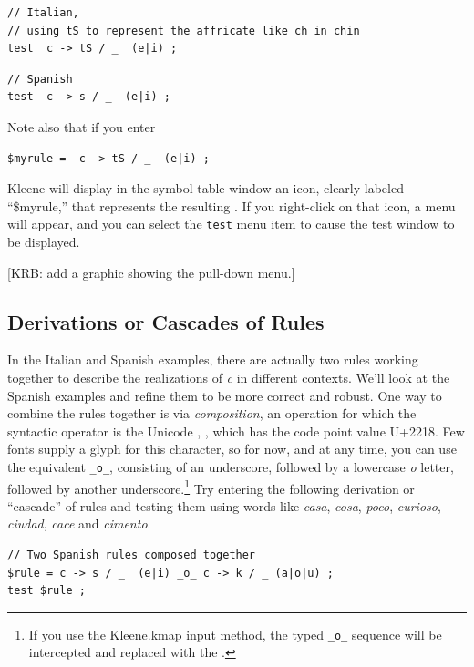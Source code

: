 \begin{Verbatim}
// Italian, 
// using tS to represent the affricate like ch in chin
test  c -> tS / _  (e|i) ;
\end{Verbatim}

\begin{Verbatim}
// Spanish
test  c -> s / _  (e|i) ;
\end{Verbatim}


\noindent
Note also that if you enter

\begin{Verbatim}
$myrule =  c -> tS / _  (e|i) ;
\end{Verbatim}

\noindent
Kleene will display in the symbol-table window an icon, clearly labeled ``\$myrule,'' that represents the resulting
.  If you right-click on that icon, a menu will appear, and you can select the \texttt{test} menu item to
cause the test window to be displayed.

[KRB:  add a graphic showing the pull-down menu.]

\subsection{Derivations or Cascades of Rules}

In the Italian and Spanish examples, there are actually two rules working together to describe the realizations of
\emph{c} in different contexts.  We'll look at the Spanish examples and refine them to be more correct and robust.  One
way to combine the rules together is via \emph{composition}, an
operation for which the syntactic 
operator is the Unicode , \ringop{}, which
has the code point value U+2218.  Few fonts supply a glyph for this
character, so for now, and at any time, you can use
the  equivalent \verb!_o_!, consisting of an
underscore, followed by a lowercase \emph{o} letter, followed by another underscore.\footnote{If you use the
Kleene.kmap input method, the typed \verb!_o_! sequence will be
intercepted and replaced with the  \ringop{}.}
Try entering the following derivation or ``cascade'' of rules and testing them using words like \emph{casa},
\emph{cosa}, \emph{poco}, \emph{curioso}, \emph{ciudad}, \emph{cace} and \emph{cimento}.


\begin{Verbatim}
// Two Spanish rules composed together
$rule = c -> s / _  (e|i) _o_ c -> k / _ (a|o|u) ;
test $rule ;
\end{Verbatim}

